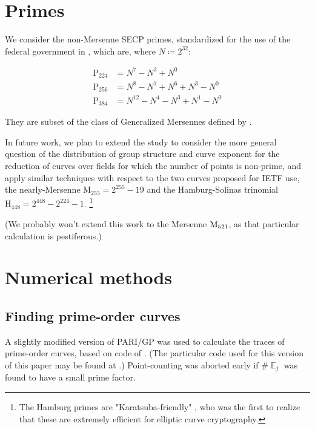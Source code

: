 \documentclass[11pt,fleqn]{article}
\newcommand{\Pa}{\ensuremath{\mathup{P}_{224}} }
\newcommand{\Pb}{\ensuremath{\mathup{P}_{256}} }
\newcommand{\Pc}{\ensuremath{\mathup{P}_{384}} }
\newcommand{\Pd}{\ensuremath{\mathup{M}_{255}} }
\newcommand{\Pg}{\ensuremath{\mathup{H}_{448}} }
\newcommand{\Ej}{\ensuremath{\BbbE_j} }
\begin{document}
\section{Primes}

We consider the non-Mersenne SECP primes, standardized for the use of the
federal government in \cite{recur}, which are, where $N \coloneqq 2^{32}$:

\begin{equation}
\begin{aligned}
    \Pa &= N^7 - N^3 + N^0                \\
    \Pb &= N^8 - N^7 + N^6 + N^3 - N^0    \\
    \Pc &= N^{12} - N^4 - N^3 + N^1 - N^0
\end{aligned}
\end{equation}

They are subset of the class of Generalized Mersennes defined by
\autocite{Solinas}.


In future work, we plan to extend the study to consider the more general question
of the distribution of group structure and curve exponent for the reduction of
curves over fields for which the number of points is non-prime, and apply similar
techniques with respect to the two curves proposed for IETF use, the nearly-Mersenne
$\Pd = 2^{255}-19$ and the Hamburg-Solinas trinomial $\Pg = 2^{448}-2^{224}-1$.
\footnote{The Hamburg primes are "Karatsuba-friendly" \cite{Hamburg}, who was the
first to realize that these are extremely efficient for elliptic curve cryptography.}

(We probably won't extend this work to the Mersenne $\textup{M}_{521}$, as that
particular calculation is pestiferous.)

\section{Numerical methods}

\subsection{Finding prime-order curves}

A slightly modified version of PARI/GP was used to calculate the
traces of prime-order curves, based on code of \cite{Hamburg}.
(The particular code used for this version of this paper may be
found at \autocite{junkpari}.) Point-counting was aborted early
if $\#\Ej$ was found to have a small prime factor.
\end{document}
